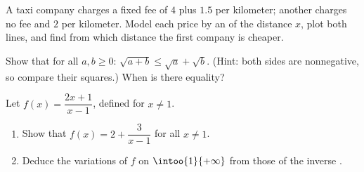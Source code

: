\begin{exercise}[$\star\star$]\label{exo:g10:reffunc:8}
A taxi company charges a fixed fee of $4$ plus $1.5$ per kilometer;
another charges no fee and $2$ per kilometer. Model each price by an
 of the distance $x$, plot both lines, and find from which
distance the first company is cheaper.
\end{exercise}

\begin{exercise}[$\star\star$]\label{exo:g10:reffunc:9}
Show that for all $a, b \geq 0$: $\sqrt{a + b} \leq \sqrt a + \sqrt b$.
(Hint: both sides are nonnegative, so compare their squares.) When is
there equality?
\end{exercise}

\begin{exercise}[$\star\star\star$]\label{exo:g10:reffunc:10}
Let $f(x) = \dfrac{2x + 1}{x - 1}$, defined for $x \neq 1$.
\begin{enumerate}
  \item Show that $f(x) = 2 + \dfrac{3}{x - 1}$ for all $x \neq 1$.
  \item Deduce the variations of $f$ on $\intoo{1}{+\infty}$ from those
        of the inverse .
\end{enumerate}
\end{exercise}
